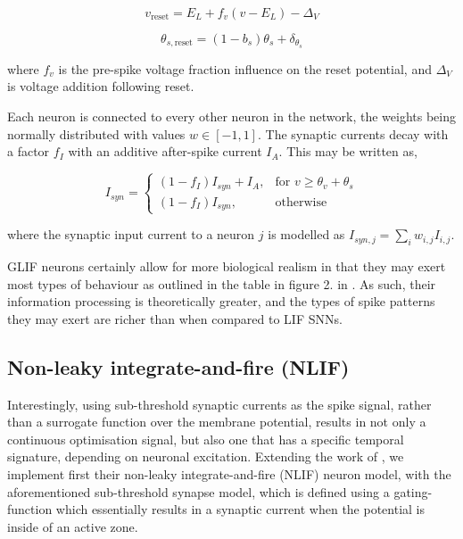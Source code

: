 \documentclass[mphil,deptreport,ianc]{infthesis} %
\begin{document}
\begin{equation}
    v_{\text{reset}} = E_L + f_v (v - E_L) - \Delta_V
\end{equation}

\begin{equation}
    \theta_{s,\text{reset}} = (1 - b_s) \theta_s + \delta_{\theta_s}
\end{equation}

where $f_v$ is the pre-spike voltage fraction influence on the reset potential, and $\Delta_V$ is voltage addition following reset.

Each neuron is connected to every other neuron in the network, the weights being normally distributed with values $w \in [-1, 1]$. The synaptic currents decay with a factor $f_I$ with an additive after-spike current $I_A$. This may be written as,

\begin{equation}
    I_{syn} = \begin{cases}
        (1 - f_I) I_{syn} + I_A, & \text{for } v \geq \theta_v + \theta_s \\
        (1 - f_I) I_{syn}, & \text{otherwise}
    \end{cases}
\end{equation}

where the synaptic input current to a neuron $j$ is modelled as $I_{syn,j} = \sum_{i} w_{i,j} I_{i,j}$.

GLIF neurons certainly allow for more biological realism in that they may exert most types of behaviour as outlined in the table in figure 2. in \cite{Izhikevich2006}.
As such, their information processing is theoretically greater, and the types of spike patterns they may exert are richer than when compared to LIF SNNs.


\subsection{Non-leaky integrate-and-fire (NLIF)}

Interestingly, using sub-threshold synaptic currents as the spike signal, rather than a surrogate function over the membrane potential, results in not only a continuous optimisation signal, but also one that has a specific temporal signature, depending on neuronal excitation.
Extending the work of \cite{Huh2017}, we implement first their non-leaky integrate-and-fire (NLIF) neuron model, with the aforementioned sub-threshold synapse model, which is defined using a gating-function which essentially results in a synaptic current when the potential is inside of an active zone.
\end{document}
